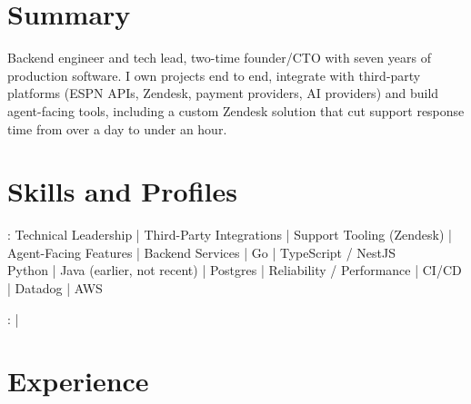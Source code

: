\documentclass[print]{jack-resume}
\begin{document}
\pagecolor{darkmodeBackground}


\begin{minipage}[t][1cm][t]{.03\textwidth}
    \hfill
\end{minipage}

\section{Summary}
Backend engineer and tech lead, two-time founder/CTO with seven years of production software. I own projects end to end, integrate with third-party platforms (ESPN APIs, Zendesk, payment providers, AI providers) and build agent-facing tools, including a custom Zendesk solution that cut support response time from over a day to under an hour.
\sectionsep

\section{Skills and Profiles}
:
Technical Leadership \hfill | \hfill
Third-Party Integrations \hfill | \hfill
Support Tooling (Zendesk) \hfill | \hfill
Agent-Facing Features \hfill | \hfill
Backend Services \hfill | \hfill
Go \hfill | \hfill
TypeScript / NestJS \\
\hspace{1.0cm} Python \hfill | \hfill
Java (earlier, not recent) \hfill | \hfill
Postgres \hfill | \hfill
Reliability / Performance \hfill | \hfill
CI/CD \hfill | \hfill
Datadog \hfill | \hfill
AWS \\

\raggedright{
    :
      \href{https://www.linkedin.com/in/jack-sturtevant/}{ \ExternalLink} |
     \href{https://github.com/jacksturt}{ \ExternalLink}}

\section{Experience}
\end{document}
